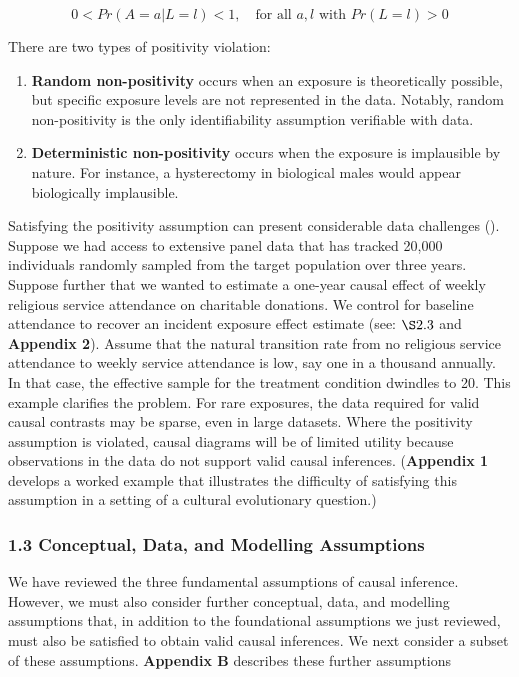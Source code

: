 \documentclass[
  singlecolumn]{article}
\begin{document}
\[
0 < Pr(A = a | L = l) < 1, \quad \text{for all } a, l \text{ with } Pr(L = l) > 0
\]

There are two types of positivity violation:

\begin{enumerate}
\def\labelenumi{\arabic{enumi}.}
\item
  \textbf{Random non-positivity} occurs when an exposure is
  theoretically possible, but specific exposure levels are not
  represented in the data. Notably, random non-positivity is the only
  identifiability assumption verifiable with data.
\item
  \textbf{Deterministic non-positivity} occurs when the exposure is
  implausible by nature. For instance, a hysterectomy in biological
  males would appear biologically implausible.
\end{enumerate}

Satisfying the positivity assumption can present considerable data
challenges ().
Suppose we had access to extensive panel data that has tracked 20,000
individuals randomly sampled from the target population over three
years. Suppose further that we wanted to estimate a one-year causal
effect of weekly religious service attendance on charitable donations.
We control for baseline attendance to recover an incident exposure
effect estimate (see: \(\S 2.3\) and \textbf{Appendix 2}). Assume that
the natural transition rate from no religious service attendance to
weekly service attendance is low, say one in a thousand annually. In
that case, the effective sample for the treatment condition dwindles to
20. This example clarifies the problem. For rare exposures, the data
required for valid causal contrasts may be sparse, even in large
datasets. Where the positivity assumption is violated, causal diagrams
will be of limited utility because observations in the data do not
support valid causal inferences. (\textbf{Appendix 1} develops a worked
example that illustrates the difficulty of satisfying this assumption in
a setting of a cultural evolutionary question.)

\subsubsection{1.3 Conceptual, Data, and Modelling
Assumptions}\label{conceptual-data-and-modelling-assumptions}

We have reviewed the three fundamental assumptions of causal inference.
However, we must also consider further conceptual, data, and modelling
assumptions that, in addition to the foundational assumptions we just
reviewed, must also be satisfied to obtain valid causal inferences. We
next consider a subset of these assumptions. \textbf{Appendix B}
describes these further assumptions
\end{document}
